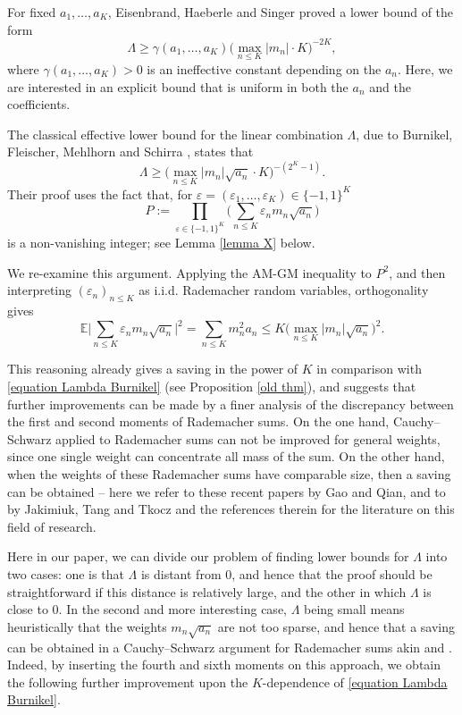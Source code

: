 \documentclass[reqno,12pt]{amsart}
\theoremstyle{remark}
\newcommand{\EE}{\mathbb{E}}
\begin{document}
For fixed $a_1,\ldots,a_K$, Eisenbrand, Haeberle and Singer \cite{eisenbrand_haeberle_singer_square_roots} proved a lower bound of the form
$$ \Lambda\geq \gamma(a_1,\ldots,a_K) \bigg(\max_{n\leq K}|m_n| \cdot K\bigg)^{-2K},$$
where $\gamma(a_1,\ldots,a_K)>0$ is an ineffective constant depending on the $a_n$. Here, we are interested in an explicit bound that is uniform in both the $a_n$ and the coefficients.

The classical effective lower bound for the linear combination $\Lambda$, due to Burnikel, Fleischer, Mehlhorn and Schirra \cite{burnikel_et_al_square_roots}, states that
\begin{equation}\label{equation Lambda Burnikel}
\Lambda\geq \bigg(\max_{n\leq K}|m_n|\sqrt{a_n}\cdot K\bigg)^{-(2^{K}-1)}.    
\end{equation}
Their proof uses the fact that, for $\varepsilon=(\varepsilon_1,\ldots,\varepsilon_K)\in\{-1,1\}^K$
$$P := \prod_{\varepsilon\in\{-1,1\}^K}\bigg(\sum_{n\leq K}\varepsilon_n m_n\sqrt{a_n}\bigg)$$
is a non-vanishing integer; see Lemma \ref{lemma X} below.

We re-examine this argument. Applying the AM-GM inequality to $P^2$, and then interpreting $(\varepsilon_n)_{n\leq K}$ as i.i.d. Rademacher random variables, orthogonality gives
$$ \EE\bigg|\sum_{n\leq K}\varepsilon_n m_n\sqrt{a_n}\bigg|^2 = \sum_{n\leq K}m_n^2 a_n \leq K\bigg(\max_{n\leq K}|m_n|\sqrt{a_n}\bigg)^2. $$

This reasoning already gives a saving in the power of $K$ in comparison with \eqref{equation Lambda Burnikel} (see Proposition \ref{old thm}), and suggests that further improvements can be made by a finer analysis of the discrepancy between the first and second moments of Rademacher sums. On the one hand, Cauchy--Schwarz applied to Rademacher sums can not be improved for general weights, since one single weight can concentrate all mass of the sum. On the other hand, when the weights of these Rademacher sums have comparable size, then a saving can be obtained -- here we refer to these recent papers \cite{gao_qian} by Gao and Qian, and to \cite{Jakimiuk_et_al} by Jakimiuk, Tang and Tkocz and the references therein for the literature on this field of research.

Here in our paper, we can divide our problem of finding lower bounds for $\Lambda$ into two cases: one is that $\Lambda$ is distant from $0$, and hence that the proof should be straightforward if this distance is relatively large, and the other in which $\Lambda$ is close to 0. In the second and more interesting case, $\Lambda$ being small means heuristically that the weights $m_n\sqrt{a_n}$ are not too sparse, and hence that a saving can be obtained in a Cauchy--Schwarz argument for Rademacher sums akin \cite{gao_qian} and \cite{Jakimiuk_et_al}. Indeed, by inserting the fourth and sixth moments on this approach, we obtain the following further improvement upon the $K$-dependence of \eqref{equation Lambda Burnikel}.
\end{document}
